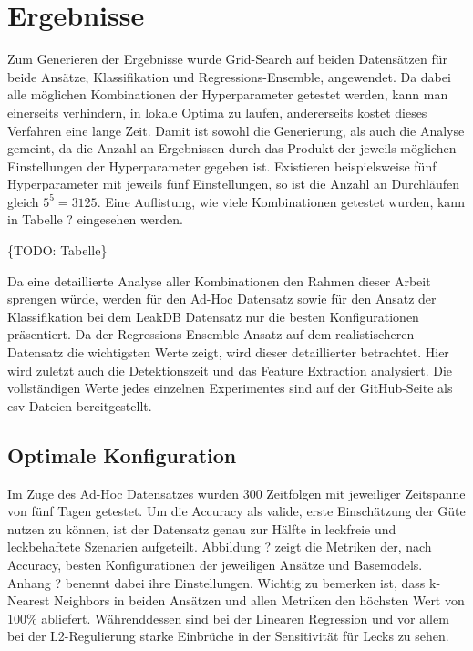 \chapter{Ergebnisse}

Zum Generieren der Ergebnisse wurde Grid-Search auf beiden Datensätzen für beide Ansätze, Klassifikation und
 Regressions-Ensemble, angewendet. Da dabei alle möglichen Kombinationen der Hyperparameter getestet werden,
 kann man einerseits verhindern, in lokale Optima zu laufen, andererseits kostet dieses Verfahren eine lange
 Zeit. Damit ist sowohl die Generierung, als auch die Analyse gemeint, da die Anzahl an Ergebnissen durch das
 Produkt der jeweils möglichen Einstellungen der Hyperparameter gegeben ist. Existieren beispielsweise fünf
 Hyperparameter mit jeweils fünf Einstellungen, so ist die Anzahl an Durchläufen gleich $5^5=3125$.
 Eine Auflistung, wie viele Kombinationen getestet wurden, kann in Tabelle ? eingesehen werden.

\{TODO: Tabelle\}

Da eine detaillierte Analyse aller Kombinationen den Rahmen dieser Arbeit sprengen würde, werden für den
 Ad-Hoc Datensatz sowie für den Ansatz der Klassifikation bei dem LeakDB Datensatz nur die besten Konfigurationen
 präsentiert. Da der Regressions-Ensemble-Ansatz auf dem realistischeren Datensatz die wichtigsten Werte zeigt,
 wird dieser detaillierter betrachtet. Hier wird zuletzt auch die Detektionszeit und das Feature Extraction
 analysiert. Die vollständigen Werte jedes einzelnen Experimentes sind auf der GitHub-Seite als csv-Dateien
 bereitgestellt.

\section{Optimale Konfiguration}

Im Zuge des Ad-Hoc Datensatzes wurden 300 Zeitfolgen mit jeweiliger Zeitspanne von fünf Tagen getestet. Um die
 Accuracy als valide, erste Einschätzung der Güte nutzen zu können, ist der Datensatz genau zur Hälfte in
 leckfreie und leckbehaftete Szenarien aufgeteilt. Abbildung ? zeigt die Metriken der, nach Accuracy, besten
Konfigurationen der jeweiligen Ansätze und Basemodels. Anhang ? benennt dabei ihre Einstellungen. Wichtig zu
bemerken ist, dass k-Nearest Neighbors in beiden Ansätzen und allen Metriken den höchsten Wert von 100\%
abliefert. Währenddessen sind bei der Linearen Regression und vor allem bei der L2-Regulierung starke Einbrüche
in der Sensitivität für Lecks zu sehen.

